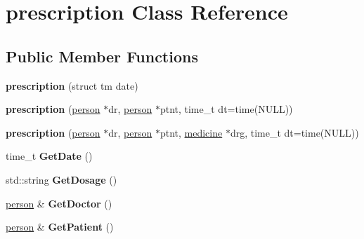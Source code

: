 \hypertarget{classprescription}{\section{prescription Class Reference}
\label{d0/dd9/classprescription}
}
\subsection*{Public Member Functions}
\begin{DoxyCompactItemize}
\item 
\hypertarget{classprescription_a03733b36abadb1d5cb04e126a79d3237}{{\bfseries prescription} (struct tm date)}\label{d0/dd9/classprescription_a03733b36abadb1d5cb04e126a79d3237}

\item 
\hypertarget{classprescription_a863f80f57af060d86ed8f089c3779afb}{{\bfseries prescription} (\hyperlink{classperson}{person} $\ast$dr, \hyperlink{classperson}{person} $\ast$ptnt, time\-\_\-t dt=time(N\-U\-L\-L))}\label{d0/dd9/classprescription_a863f80f57af060d86ed8f089c3779afb}

\item 
\hypertarget{classprescription_af1f7834158a21749b9a8f4c3e975aa4b}{{\bfseries prescription} (\hyperlink{classperson}{person} $\ast$dr, \hyperlink{classperson}{person} $\ast$ptnt, \hyperlink{structmedicine}{medicine} $\ast$drg, time\-\_\-t dt=time(N\-U\-L\-L))}\label{d0/dd9/classprescription_af1f7834158a21749b9a8f4c3e975aa4b}

\item 
\hypertarget{classprescription_afb30c7295fd7fa2627ff622d1fc176b9}{time\-\_\-t {\bfseries Get\-Date} ()}\label{d0/dd9/classprescription_afb30c7295fd7fa2627ff622d1fc176b9}

\item 
\hypertarget{classprescription_ae1240cbb14197dd98f71367b71dc98c4}{std\-::string {\bfseries Get\-Dosage} ()}\label{d0/dd9/classprescription_ae1240cbb14197dd98f71367b71dc98c4}

\item 
\hypertarget{classprescription_abada4fa8c7787b2144903de430033679}{\hyperlink{classperson}{person} \& {\bfseries Get\-Doctor} ()}\label{d0/dd9/classprescription_abada4fa8c7787b2144903de430033679}

\item 
\hypertarget{classprescription_a1e72c9b1f889eb61a63c1689053e878e}{\hyperlink{classperson}{person} \& {\bfseries Get\-Patient} ()}\label{d0/dd9/classprescription_a1e72c9b1f889eb61a63c1689053e878e}


\end{DoxyCompactItemize}
